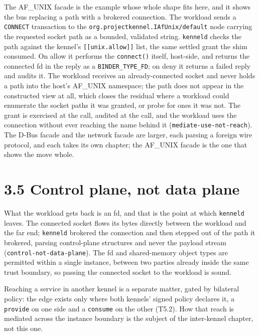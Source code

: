 The AF\_UNIX facade is the example whose whole shape fits here, and it
shows the bus replacing a path with a brokered connection. The workload
sends a \texttt{CONNECT} transaction to the
\texttt{org.projectkennel.IAfUnix/default} node carrying the requested
socket path as a bounded, validated string. \texttt{kenneld} checks the
path against the kennel's \texttt{{[}{[}unix.allow{]}{]}} list, the same
settled grant the shim consumed. On allow it performs the
\texttt{connect()} itself, host-side, and returns the connected fd in
the reply as a \texttt{BINDER\_TYPE\_FD}; on deny it returns a failed
reply and audits it. The workload receives an already-connected socket
and never holds a path into the host's AF\_UNIX namespace; the path does
not appear in the constructed view at all, which closes the residual
where a workload could enumerate the socket paths it was granted, or
probe for ones it was not. The grant is exercised at the call, audited
at the call, and the workload uses the connection without ever reaching
the name behind it (\texttt{mediate-use-not-reach}). The D-Bus facade
and the network facade are larger, each parsing a foreign wire protocol,
and each takes its own chapter; the AF\_UNIX facade is the one that
shows the move whole.

\hypertarget{control-plane-not-data-plane}{%
\section{3.5 Control plane, not data
plane}\label{control-plane-not-data-plane}}

What the workload gets back is an fd, and that is the point at which
\texttt{kenneld} leaves. The connected socket flows its bytes directly
between the workload and the far end; \texttt{kenneld} brokered the
connection and then stepped out of the path it brokered, parsing
control-plane structures and never the payload stream
(\texttt{control-not-data-plane}). The fd and shared-memory object types
are permitted within a single instance, between two parties already
inside the same trust boundary, so passing the connected socket to the
workload is sound.

Reaching a service in another kennel is a separate matter, gated by
bilateral policy: the edge exists only where both kennels' signed policy
declares it, a \texttt{provide} on one side and a \texttt{consume} on
the other (T5.2). How that reach is mediated across the instance
boundary is the subject of the inter-kennel chapter, not this one.

